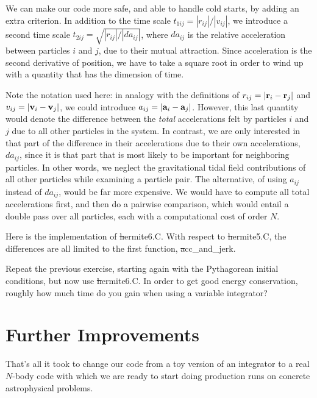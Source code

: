 We can make our code more safe, and able to handle cold starts, by
adding an extra criterion.  In addition to the time scale
$t_{1ij} = |r_{ij}|/|v_{ij}|$, we introduce a second time scale
$t_{2ij} = \sqrt{|r_{ij}|/|da_{ij}|}$, where $da_{ij}$ is the relative
acceleration between particles $i$ and $j$, due to their mutual attraction.
Since acceleration is the second derivative of position, we have to
take a square root in order to wind up with a quantity that has the
dimension of time.

Note the notation used here: in analogy with the definitions of
$r_{ij} = |{\bf r}_i - {\bf r}_j|$ and $v_{ij} = |{\bf v}_i - {\bf v}_j|$, we could
introduce $a_{ij} = |{\bf a}_i - {\bf a}_j|$.  However, this last quantity
would denote the difference between the {\it total} accelerations felt
by particles $i$ and $j$ due to all other particles in the system.  In
contrast, we are only interested in that part of the difference in
their accelerations due to their own accelerations, $da_{ij}$, since
it is that part that is most likely to be important for neighboring
particles.  In other words, we neglect the gravitational tidal field
contributions of all other particles while examining a particle pair.
The alternative, of using $a_{ij}$ instead of $da_{ij}$, would be
far more expensive.  We would have to compute all total accelerations
first, and then do a pairwise comparison, which would entail a double
pass over all particles, each with a computational cost of order $N$.

Here is the implementation of {\st hermite6.C}.  With respect to
{\st hermite5.C}, the differences are all limited to the first function,
{\st acc\_and\_jerk}.


\begin{Exercise}\label{ex:pp2}
Repeat the previous exercise, starting again with the Pythagorean
initial conditions, but now use {\st hermite6.C}.  In order to get
good energy conservation, roughly how much time do you gain when using
a variable integrator?
\end{Exercise}

\section{Further Improvements}

That's all it took to change our code from a toy version of an integrator
to a real $N$-body code with which we are ready to start doing production
runs on concrete astrophysical problems.

